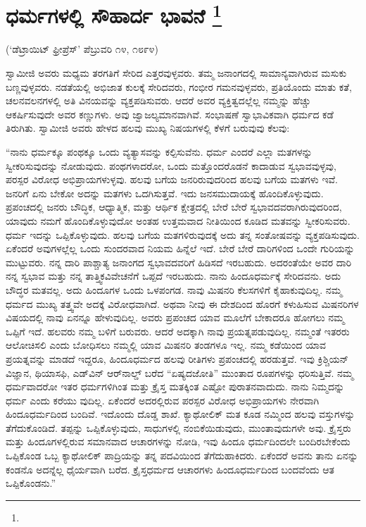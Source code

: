 
\chapter[ಧರ್ಮಗಳಲ್ಲಿ ಸೌಹಾರ್ದ ಭಾವನೆ ]{ಧರ್ಮಗಳಲ್ಲಿ ಸೌಹಾರ್ದ ಭಾವನೆ \protect\footnote{}}

\centerline{(‘ಡೆಟ್ರಾಯಿಟ್​ ಫ್ರೀಪ್ರೆಸ್​’ ಪೆಬ್ರುವರಿ ೧೪, ೧೮೯೪)}

ಸ್ವಾಮೀಜಿ ಅವರು ಮಧ್ಯಮ ತರಗತಿಗೆ ಸೇರಿದ ಎತ್ತರವುಳ್ಳವರು. ತಮ್ಮ ಜನಾಂಗದಲ್ಲಿ ಸಾಮಾನ್ಯವಾಗಿರುವ ಮಸುಕು ಬಣ್ಣವುಳ್ಳವರು. ನಡತೆಯಲ್ಲಿ ಅಭಿಜಾತ ಕುಲಕ್ಕೆ ಸೇರಿದವರು, ಗಂಭೀರ ಗಮನವುಳ್ಳವರು, ಪ್ರತಿಯೊಂದು ಮಾತು ಕತೆ, ಚಲನವಲನಗಳಲ್ಲಿ ಅತಿ ವಿನಯವನ್ನು ವ್ಯಕ್ತಪಡಿಸುವರು. ಆದರೆ ಅವರ ವ್ಯಕ್ತಿತ್ವದಲ್ಲೆಲ್ಲ ನಮ್ಮನ್ನು ಹೆಚ್ಚು ಆಕರ್ಷಿಸುವುದೇ ಅವರ ಕಣ್ಣುಗಳು. ಅವು ಜ್ವಾಜಲ್ಯಮಾನವಾಗಿವೆ. ಸಂಭಾಷಣೆ ಸ್ವಾಭಾವಿಕವಾಗಿ ಧರ್ಮದ ಕಡೆ ತಿರುಗಿತು. ಸ್ವಾಮೀಜಿ ಅವರು ಹೇಳದ ಹಲವು ಮುಖ್ಯ ನಿಷಯಗಳಲ್ಲಿ ಕೆಳಗೆ ಬರುವುವು ಕೆಲವು:

“ನಾನು ಧರ್ಮಕ್ಕೂ ಪಂಥಕ್ಕೂ ಒಂದು ವ್ಯತ್ಯಾಸವನ್ನು ಕಲ್ಪಿಸುವೆನು. ಧರ್ಮ ಎಂದರೆ ಎಲ್ಲಾ ಮತಗಳನ್ನು ಸ್ವೀಕರಿಸುವುದನ್ನು ನೋಡುವುದು. ಪಂಥಗಳಾದರೋ, ಒಂದು ಮತ್ತೊಂದರೊಡನೆ ಕಾದಾಡುವ ಸ್ವಭಾವವುಳ್ಳವು, ಪರಸ್ಪರ ವಿರೋಧ ಅಭಿಪ್ರಾಯಗಳುಳ್ಳವು. ಹಲವು ಬಗೆಯ ಜನರಿರುವುದರಿಂದ ಹಲವು ಬಗೆಯ ಮತಗಳು ಇವೆ. ಜನರಿಗೆ ಏನು ಬೇಕೋ ಅದನ್ನು ಮತಗಳು ಒದಗಿಸುತ್ತವೆ. ಇದು ಜನಸಮುದಾಯಕ್ಕೆ ಹೊಂದಿಕೊಳ್ಳುವುದು. ಪ್ರಪಂಚದಲ್ಲಿ ಜನರು ಬೌದ್ಧಿಕ, ಆಧ್ಯಾತ್ಮಿಕ, ಮತ್ತು ಆರ್ಥಿಕ ಕ್ಷೇತ್ರದಲ್ಲಿ ಬೇರೆ ಬೇರೆ ಸ್ವಭಾವದವರಾಗಿರುವುದರಿಂದ, ಯಾವುದು ನಮಗೆ ಹೊಂದಿಕೊಳ್ಳುವುದೋ ಅಂತಹ ಉತ್ತಮವಾದ ನೀತಿಯಿಂದ ಕೂಡಿದ ಮತವನ್ನು ಸ್ವೀಕರಿಸುವರು. ಧರ್ಮ ಇದನ್ನು ಒಪ್ಪಿಕೊಳ್ಳುವುದು. ಹಲವು ಬಗೆಯ ಮತಗಳಿರುವುದಕ್ಕೆ ಅದು ತನ್ನ ಸಂತೋಷವನ್ನು ವ್ಯಕ್ತಪಡಿಸುವುದು. ಏಕೆಂದರೆ ಅವುಗಳಲ್ಲೆಲ್ಲ ಒಂದು ಸುಂದರವಾದ ನಿಯಮ ಹಿನ್ನೆಲೆ ಇದೆ. ಬೇರೆ ಬೇರೆ ದಾರಿಗಳಿಂದ ಒಂದೇ ಗುರಿಯನ್ನು ಮುಟ್ಟುವರು. ನನ್ನ ದಾರಿ ಪಾಶ್ಚಾತ್ಯ ಜನಾಂಗದ ಸ್ವಭಾವದವರಿಗೆ ಹಿಡಿಸದೆ ಇರಬಹುದು. ಅದರಂತೆಯೇ ಅವರ ದಾರಿ ನನ್ನ ಸ್ವಭಾವ ಮತ್ತು ನನ್ನ ತಾತ್ತ್ವಿಕವಿವೇಚನೆಗೆ ಒಪ್ಪದೆ ಇರಬಹುದು. ನಾನು ಹಿಂದೂಧರ್ಮಕ್ಕೆ ಸೇರಿದವನು. ಅದು ಬೌದ್ಧರ ಮತವಲ್ಲ. ಅದು ಹಿಂದೂಗಳ ಒಂದು ಒಳಪಂಗಡ. ನಾವು ಮಿಷನರಿ ಕೆಲಸಗಳಿಗೆ ಕೈಹಾಕುವುದಿಲ್ಲ. ನಮ್ಮ ಧರ್ಮದ ಮುಖ್ಯ ತತ್ತ್ವವೇ ಅದಕ್ಕೆ ವಿರೋಧವಾಗಿದೆ. ಅಥವಾ ನೀವು ಈ ದೇಶದಿಂದ ಹೊರಗೆ ಕಳುಹಿಸುವ ಮಿಷನರಿಗಳ ವಿಷಯದಲ್ಲಿ ನಾವು ಏನನ್ನೂ ಹೇಳುವುದಿಲ್ಲ. ಅವರು ಪ್ರಪಂಚದ ಯಾವ ಮೂಲೆಗೆ ಬೇಕಾದರೂ ಹೋಗಲು ನಮ್ಮ ಒಪ್ಪಿಗೆ ಇದೆ. ಹಲವರು ನಮ್ಮ ಬಳಿಗೆ ಬರುವರು. ಆದರೆ ಅದಕ್ಕಾಗಿ ನಾವು ಪ್ರಯತ್ನಪಡುವುದಿಲ್ಲ. ನಮ್ಮಂತೆ ಇತರರು ಆಲೋಚಿಸಲಿ ಎಂದು ಬೋಧಿಸಲು ನಮ್ಮಲ್ಲಿ ಯಾವ ಮಿಷನರಿ ತಂಡಗಳೂ ಇಲ್ಲ. ನಮ್ಮ ಕಡೆಯಿಂದ ಯಾವ ಪ್ರಯತ್ನವನ್ನು ಮಾಡದೆ ಇದ್ದರೂ, ಹಿಂದೂಧರ್ಮದ ಹಲವು ರೀತಿಗಳು ಪ್ರಪಂಚದಲ್ಲಿ ಹರಡುತ್ತವೆ. ಇವು ಕ್ರಿಶ್ಚಿಯನ್​ ವಿಜ್ಞಾನ, ಥಿಯಾಸಫಿ, ಎಡ್​ವಿನ್​ ಆರ್​ನಾಲ್ಡ್​ ಬರೆದ “ಏಷ್ಯದಜೋತಿ” ಮುಂತಾದ ರೂಪಗಳನ್ನು ಧರಿಸುತ್ತಿವೆ. ನಮ್ಮ ಧರ್ಮವಾದರೋ ಇತರ ಧರ್ಮಗಳಿಗಿಂತ ಮತ್ತು ಕ್ರೈಸ್ತ ಮತಕ್ಕಿಂತ ಎಷ್ಟೋ ಪುರಾತನವಾದುದು. ನಾನು ನಿಮ್ಮದನ್ನು ಧರ್ಮ ಎಂದು ಕರೆಯು ವುದಿಲ್ಲ. ಏಕೆಂದರೆ ಅದರಲ್ಲಿರುವ ಪರಸ್ಪರ ವಿರೋಧ ಅಭಿಪ್ರಾಯಗಳು ನೇರವಾಗಿ ಹಿಂದೂಧರ್ಮದಿಂದ ಬಂದಿವೆ. ಇದೊಂದು ದೊಡ್ಡ ಶಾಖೆ. ಕ್ಯಾಥೋಲಿಕ್​ ಮತ ಕೂಡ ನಮ್ಮಿಂದ ಹಲವು ವಸ್ತುಗಳನ್ನು ತೆಗೆದುಕೊಂಡಿದೆ. ತಪ್ಪನ್ನು ಒಪ್ಪಿಕೊಳ್ಳುವುದು, ಸಾಧುಗಳಲ್ಲಿ ನಂಬಿಕೆಯಿಡುವುದು, ಮುಂತಾವುದುಗಳೇ ಅವು. ಕ್ರೈಸ್ತರು ಮತ್ತು ಹಿಂದೂಗಳಲ್ಲಿರುವ ಸಮಾನವಾದ ಆಚಾರಗಳನ್ನು ನೋಡಿ, ಇವು ಹಿಂದೂ ಧರ್ಮದಿಂದಲೇ ಬಂದಿರಬೇಕೆಂದು ಒಪ್ಪಿಕೊಂಡ ಒಬ್ಬ ಕ್ಯಾಥೋಲಿಕ್​ ಪಾದ್ರಿಯನ್ನು ತನ್ನ ಪದವಿಯಿಂದ ತೆಗೆದುಹಾಕಿದರು. ಏಕೆಂದರೆ ಅವನು ತಾನು ಏನನ್ನು ಕಂಡನೊ ಅದನ್ನೆಲ್ಲ ಧೈರ್ಯವಾಗಿ ಬರೆದ. ಕ್ರೈಸ್ತಧರ್ಮದ ಆಚಾರಗಳು ಹಿಂದೂಧರ್ಮದಿಂದ ಬಂದವೆಂದು ಆತ ಒಪ್ಪಿಕೊಂಡನು.”

